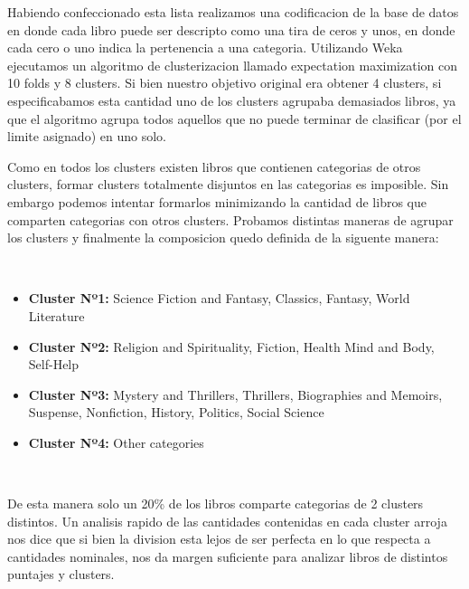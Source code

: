 \documentclass[12pt,journal,compsoc]{IEEEtran}
\begin{document}

Habiendo confeccionado esta lista realizamos una codificacion de la base de datos en donde cada libro puede ser descripto como una tira de ceros y unos, en donde cada cero o uno indica la pertenencia a una categoria. Utilizando Weka ejecutamos un algoritmo de clusterizacion llamado expectation maximization con 10 folds y 8 clusters. Si bien nuestro objetivo original era obtener 4 clusters, si especificabamos esta cantidad uno de los clusters agrupaba demasiados libros, ya que el algoritmo agrupa todos aquellos que no puede terminar de clasificar (por el limite asignado) en uno solo.

Como en todos los clusters existen libros que contienen categorias de otros clusters, formar clusters totalmente disjuntos en las categorias es imposible. Sin embargo podemos intentar formarlos minimizando la cantidad de libros que comparten categorias con otros clusters. Probamos distintas maneras de agrupar los clusters y finalmente la composicion quedo definida de la siguente manera:

~

\begin{itemize}
\item \textbf{Cluster Nº1:} Science Fiction and Fantasy, Classics, Fantasy, World Literature
\item \textbf{Cluster Nº2:} Religion and Spirituality, Fiction, Health Mind and Body, Self-Help
\item \textbf{Cluster Nº3:} Mystery and Thrillers, Thrillers, Biographies and Memoirs, Suspense, Nonfiction, History, Politics, Social Science
\item \textbf{Cluster Nº4:} Other categories
\end{itemize}

~

De esta manera solo un 20\% de los libros comparte categorias de 2 clusters distintos. Un analisis rapido de las cantidades contenidas en cada cluster arroja nos dice que si bien la division esta lejos de ser perfecta en lo que respecta a cantidades nominales, nos da margen suficiente para analizar libros de distintos puntajes y clusters.

~
\end{document}
